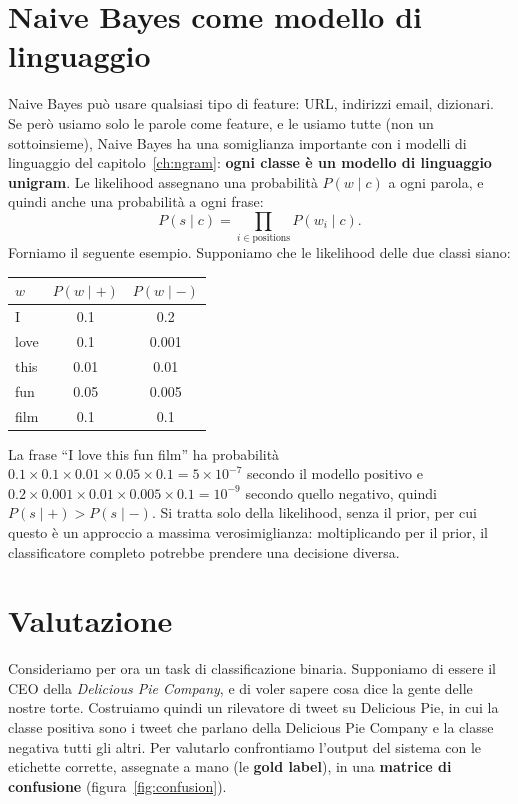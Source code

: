 \section{Naive Bayes come modello di linguaggio}
Naive Bayes può usare qualsiasi tipo di feature: URL, indirizzi email, dizionari. Se però usiamo solo le parole come feature, e le usiamo tutte (non un sottoinsieme), Naive Bayes ha una somiglianza importante con i modelli di linguaggio del capitolo~\ref{ch:ngram}: \textbf{ogni classe è un modello di linguaggio unigram}. Le likelihood assegnano una probabilità $P(w \mid c)$ a ogni parola, e quindi anche una probabilità a ogni frase:
\begin{equation}
P(s \mid c) = \prod_{i \in \text{positions}} P(w_i \mid c).
\end{equation}
Forniamo il seguente esempio. Supponiamo che le likelihood delle due classi siano:
\begin{center}
\begin{tabular}{lcc}
\toprule
$w$ & $P(w \mid +)$ & $P(w \mid -)$ \\
\midrule
I & 0.1 & 0.2 \\
love & 0.1 & 0.001 \\
this & 0.01 & 0.01 \\
fun & 0.05 & 0.005 \\
film & 0.1 & 0.1 \\
\bottomrule
\end{tabular}
\end{center}
La frase \enquote{I love this fun film} ha probabilità $0.1 \times 0.1 \times 0.01 \times 0.05 \times 0.1 = 5 \times 10^{-7}$ secondo il modello positivo e $0.2 \times 0.001 \times 0.01 \times 0.005 \times 0.1 = 10^{-9}$ secondo quello negativo, quindi $P(s \mid +) > P(s \mid -)$. Si tratta solo della likelihood, senza il prior, per cui questo è un approccio a massima verosimiglianza: moltiplicando per il prior, il classificatore completo potrebbe prendere una decisione diversa.

\section{Valutazione}\label{sec:nb-valutazione}
Consideriamo per ora un task di classificazione binaria. Supponiamo di essere il CEO della \textit{Delicious Pie Company}, e di voler sapere cosa dice la gente delle nostre torte. Costruiamo quindi un rilevatore di tweet su Delicious Pie, in cui la classe positiva sono i tweet che parlano della Delicious Pie Company e la classe negativa tutti gli altri. Per valutarlo confrontiamo l'output del sistema con le etichette corrette, assegnate a mano (le \textbf{gold label}), in una \textbf{matrice di confusione} (figura~\ref{fig:confusion}).

